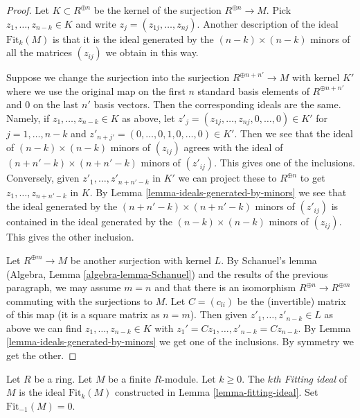 \begin{proof}
Let $K \subset R^{\oplus n}$ be the kernel of the surjection
$R^{\oplus n} \to M$. Pick $z_1, \ldots, z_{n - k} \in K$
and write $z_j = (z_{1j}, \ldots, z_{nj})$.
Another description of the ideal $\text{Fit}_k(M)$
is that it is the ideal generated by the $(n - k) \times (n - k)$ minors of
all the matrices $(z_{ij})$ we obtain in this way.

\medskip\noindent
Suppose we change the surjection into the surjection
$R^{\oplus n + n'} \to M$ with kernel $K'$ where we use the original
map on the first $n$ standard basis elements of $R^{\oplus n + n'}$
and $0$ on the last $n'$ basis vectors. Then the corresponding ideals
are the same. Namely, if $z_1, \ldots, z_{n - k} \in K$ as above,
let $z'_j = (z_{1j}, \ldots, z_{nj}, 0, \ldots, 0) \in K'$ for
$j = 1, \ldots, n - k$ and
$z'_{n + j'} = (0, \ldots, 0, 1, 0, \ldots, 0) \in K'$. Then we see that
the ideal of $(n - k) \times (n - k)$ minors of $(z_{ij})$ agrees
with the ideal of $(n + n' - k) \times (n + n' - k)$ minors of
$(z'_{ij})$. This gives one of the inclusions.
Conversely, given  $z'_1, \ldots, z'_{n + n' - k}$
in $K'$ we can project these to $R^{\oplus n}$ to get
$z_1, \ldots, z_{n + n' - k}$ in $K$. By
Lemma \ref{lemma-ideals-generated-by-minors}
we see that the ideal generated by the
$(n + n' - k) \times (n + n' - k)$ minors of
$(z'_{ij})$ is contained in the ideal generated by the
$(n - k) \times (n - k)$ minors of $(z_{ij})$. This gives the
other inclusion.

\medskip\noindent
Let $R^{\oplus m} \to M$ be another surjection with kernel $L$.
By Schanuel's lemma (Algebra, Lemma \ref{algebra-lemma-Schanuel})
and the results of the previous paragraph, we may assume $m = n$
and that there is an isomorphism $R^{\oplus n} \to R^{\oplus m}$
commuting with the surjections to $M$. Let $C = (c_{li})$ be the
(invertible) matrix of this map (it is a square matrix as $n = m$).
Then given $z'_1, \ldots, z'_{n - k} \in L$ as above we can find
$z_1, \ldots, z_{n - k} \in K$ with
$z_1' = Cz_1, \ldots, z'_{n - k} = Cz_{n - k}$. By
Lemma \ref{lemma-ideals-generated-by-minors} we get one of the
inclusions. By symmetry we get the other.
\end{proof}

\begin{definition}
\label{definition-fitting-ideal}
Let $R$ be a ring. Let $M$ be a finite $R$-module. Let $k \geq 0$.
The {\it $k$th Fitting ideal} of $M$ is the ideal $\text{Fit}_k(M)$
constructed in Lemma \ref{lemma-fitting-ideal}. Set $\text{Fit}_{-1}(M) = 0$.
\end{definition}

